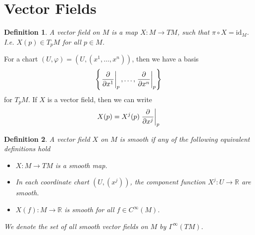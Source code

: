 \documentclass[a4paper]{article}
\newtheorem*{defn}{Definition}
\begin{document}
\section*{Vector Fields}%

\begin{defn}
  A vector field on $M$ is a map $X: M \rightarrow TM$, such that $\pi \circ X = \text{id}_M$. I.e. $X(p) \in T_pM$ for all $p \in M$.
\end{defn}

For a chart $(U, \varphi) = (U, (x^1, \dots, x^n))$, then we have a basis 
\[
  \left\{ \eval{\pdv{}{x^1}}_p, \dots, \eval{\pdv{}{x^n}}_p \right\}
\]
for $T_pM$. If $X$ is a vector field, then we can write
\[
  X(p) = X^j(p) \eval{\pdv{}{x^j}}_p
\]

\begin{defn}
  A vector field $X$ on $M$ is smooth if any of the following equivalent definitions hold
  \begin{itemize}
    \item $X: M \rightarrow TM$ is a smooth map.
    \item In each coordinate chart $(U, (x^j))$, the component function $X^j: U \rightarrow \mathds{R}$ are smooth.
    \item $X (f): M \rightarrow \mathds{R}$ is smooth for all $f \in C^{\infty}(M)$.
  \end{itemize}
We denote the set of all smooth vector fields on $M$ by $\Gamma^{\infty}(TM)$.
\end{defn}
\end{document}
